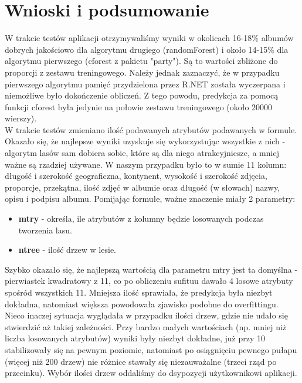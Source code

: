 \documentclass[a4paper,twoside]{article}
\begin{document}
\section{Wnioski i podsumowanie}

W trakcie testów aplikacji otrzymywaliśmy wyniki w okolicach 16-18\% albumów dobrych jakościowo dla algorytmu drugiego (randomForest) i około 14-15\% dla algorytmu pierwszego (cforest z pakietu "party"). Są to wartości zbliżone do proporcji z zestawu treningowego. Należy jednak zaznaczyć, że w przypadku pierwszego algorytmu pamięć przydzielona przez R.NET została wyczerpana i niemożliwe było dokończenie obliczeń. Z tego powodu, predykcja za pomocą funkcji cforest była jedynie na połowie zestawu treningowego (około 20000 wierszy). \\

W trakcie testów zmieniano ilość podawanych atrybutów podawanych w formule. Okazało się, że najlepsze wyniki uzyskuje się wykorzystując wszystkie z nich - algorytm lasów sam dobiera sobie, które są dla niego atrakcyjniesze, a mniej ważne są rzadziej używane. W naszym przypadku było to w sumie 11 kolumn: długość i szerokość geograficzna, kontynent, wysokość i szerokość zdjęcia, proporcje, przekątna, ilość zdjęć w albumie oraz długość (w słowach) nazwy, opisu i podpisu albumu. Pomijając formułe, ważne znaczenie miały 2 parametry:

\begin{itemize}
	\item \textbf{mtry} - określa, ile atrybutów z kolumny będzie losowanych podczas tworzenia lasu.
	\item \textbf{ntree} - ilość drzew w lesie.
\end{itemize}

Szybko okazało się, że najlepszą wartością dla parametru mtry jest ta domyślna - pierwiastek kwadratowy z 11, co po obliczeniu sufituu dawało 4 losowe atrybuty spośród wszystkich 11. Mniejsza ilość sprawiała, że predykcja była niezbyt dokładna, natomiast większa powodowała zjawisko podobne do overfittingu. Nieco inaczej sytuacja wyglądała w przypadku ilości drzew, gdzie nie udało się stwierdzić aż takiej zależności.  Przy bardzo małych wartościach (np. mniej niż liczba losowanych atrybutów) wyniki były niezbyt dokładne, już przy 10 stabilizowały się na pewnym poziomie, natomiast po osiągnięciu pewnego pułapu (więcej niż 200 drzew) nie różnice stawały się niezauważalne (trzeci rząd po przecinku). Wybór ilości drzew oddaliśmy do dsypozycji użytkownikowi aplikacji.\\
\end{document}
